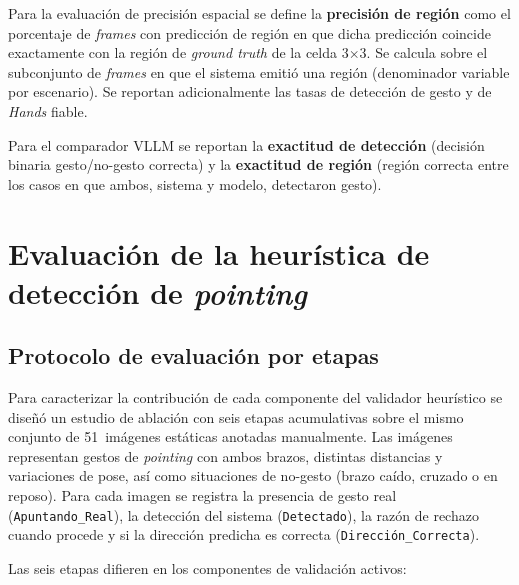 \documentclass[12pt]{report} %
\begin{document}
Para la evaluación de precisión espacial se define la \textbf{precisión de región} como el porcentaje de \textit{frames} con predicción de región en que dicha predicción coincide exactamente con la región de \textit{ground truth} de la celda 3$\times$3. Se calcula sobre el subconjunto de \textit{frames} en que el sistema emitió una región (denominador variable por escenario). Se reportan adicionalmente las tasas de detección de gesto y de \textit{Hands} fiable.

Para el comparador VLLM se reportan la \textbf{exactitud de detección} (decisión binaria gesto/no-gesto correcta) y la \textbf{exactitud de región} (región correcta entre los casos en que ambos, sistema y modelo, detectaron gesto).

\section{Evaluación de la heurística de detección de \textit{pointing}}
\label{sec:eval_heuristica}

\subsection{Protocolo de evaluación por etapas}

Para caracterizar la contribución de cada componente del validador heurístico se diseñó un estudio de ablación con seis etapas acumulativas sobre el mismo conjunto de \num{51}~imágenes estáticas anotadas manualmente. Las imágenes representan gestos de \textit{pointing} con ambos brazos, distintas distancias y variaciones de pose, así como situaciones de no-gesto (brazo caído, cruzado o en reposo). Para cada imagen se registra la presencia de gesto real (\texttt{Apuntando\_Real}), la detección del sistema (\texttt{Detectado}), la razón de rechazo cuando procede y si la dirección predicha es correcta (\texttt{Dirección\_Correcta}).

Las seis etapas difieren en los componentes de validación activos:
\end{document}
